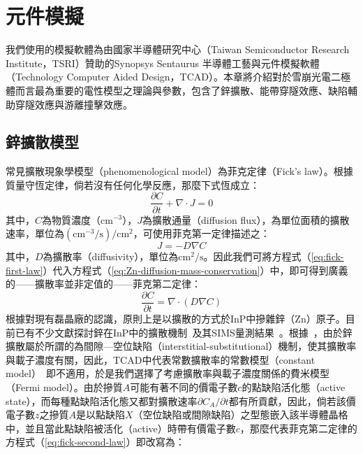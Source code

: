 \chapter{元件模擬}\label{c:modeling}
我們使用的模擬軟體為由國家半導體研究中心（Taiwan Semiconductor Research Institute，TSRI）贊助的Synopsys Sentaurus 半導體工藝與元件模擬軟體（Technology Computer Aided Design，TCAD）。本章將介紹對於雪崩光電二極體而言最為重要的電性模型之理論與參數，包含了鋅擴散、能帶穿隧效應、缺陷輔助穿隧效應與游離撞擊效應。
\section{鋅擴散模型}
常見擴散現象學模型（phenomenological model）為菲克定律（Fick's law）。根據質量守恆定律，倘若沒有任何化學反應，那麼下式恆成立：
\begin{equation}
\frac{\partial C}{\partial t}+\nabla\cdot J = 0\label{eq:Zn-diffusion-mass-conservation}
\end{equation}
其中，$C$為物質濃度（$\mathrm{cm}^{-3}$），$J$為擴散通量（diffusion flux），為單位面積的擴散速率，單位為$(\mathrm{cm}^{-3}/\mathrm{s})/\mathrm{cm}^2$，可使用菲克第一定律描述之：
\begin{equation}
J=-D\nabla C\label{eq:fick-first-law}
\end{equation}
其中，$D$為擴散率（diffusivity），單位為$\mathrm{cm}^2/\mathrm{s}$。因此我們可將方程式（\ref{eq:fick-first-law}）代入方程式（\ref{eq:Zn-diffusion-mass-conservation}）中，即可得到廣義的——擴散率並非定值的——菲克第二定律：
\begin{equation}
\frac{\partial C}{\partial t}=\nabla\cdot\left(D\nabla C\right)\label{eq:fick-second-law}
\end{equation}
\hspace{2em}根據對現有磊晶廠的認識，原則上是以擴散的方式於InP中摻雜鋅（Zn）原子。目前已有不少文獻探討鋅在InP中的擴散機制~\cite{van1987zinc}及其SIMS量測結果~\cite{chang1964diffusion}\cite{knevzevic2016analysis}。根據~\cite{van1987zinc}，由於鋅擴散屬於所謂的為間隙—空位缺陷（interstitial-substitutional）機制，使其擴散率與載子濃度有關，因此，TCAD中代表常數擴散率的常數模型（constant model）~\cite{process2016release}即不適用，於是我們選擇了考慮擴散率與載子濃度關係的費米模型（Fermi model）\cite{knevzevic2016analysis}\cite{process2016release}。由於摻質$A$可能有著不同的價電子數$c$的點缺陷活化態（active state），而每種點缺陷活化態又都對擴散速率$\partial C_A/\partial t$都有所貢獻，因此，倘若該價電子數$z$之摻質$A$是以點缺陷$X$（空位缺陷或間隙缺陷）之型態嵌入該半導體晶格中，並且當此點缺陷被活化（active）時帶有價電子數$c$，那麼代表菲克第二定律的方程式（\ref{eq:fick-second-law}）即改寫為：
